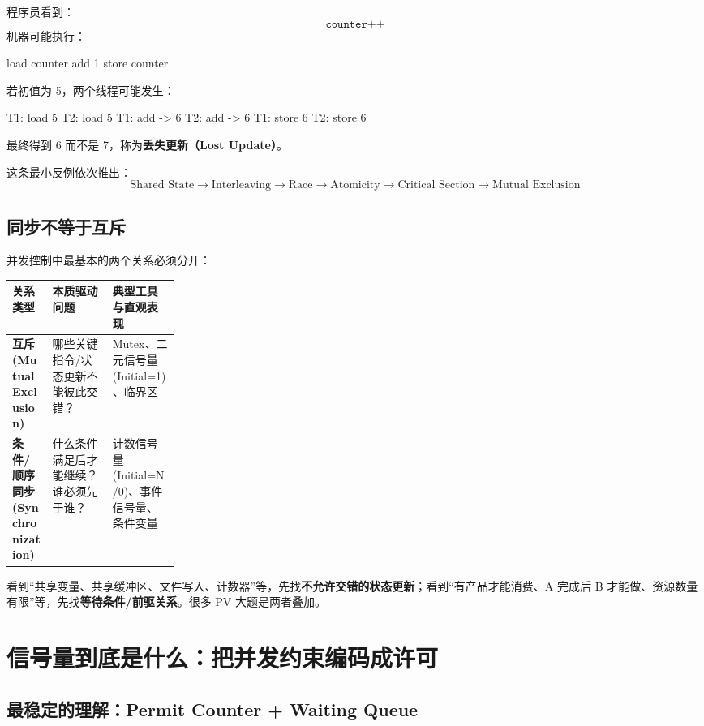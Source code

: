 \documentclass[11pt,a4paper]{ctexart}
\newcommand{\kw}[1]{\textbf{#1}}
\begin{document}
程序员看到：
\[
\texttt{counter++}
\]
机器可能执行：
\begin{codeblock}
load counter
add 1
store counter
\end{codeblock}
若初值为 5，两个线程可能发生：
\begin{codeblock}
T1: load 5
T2: load 5
T1: add  -> 6
T2: add  -> 6
T1: store 6
T2: store 6
\end{codeblock}
最终得到 6 而不是 7，称为\kw{丢失更新（Lost Update）}。

这条最小反例依次推出：
\[
\boxed{
\text{Shared State}
\to\text{Interleaving}
\to\text{Race}
\to\text{Atomicity}
\to\text{Critical Section}
\to\text{Mutual Exclusion}
}
\]

\subsection{同步不等于互斥}

并发控制中最基本的两个关系必须分开：

\begingroup
\small
\renewcommand{\arraystretch}{1.25}
\setlength{\tabcolsep}{6pt}
\begin{tabularx}{\linewidth}{>{\bfseries}p{0.24\linewidth} X X}
\toprule
关系类型 & 本质驱动问题 & 典型工具与直观表现\\
\midrule
互斥 (Mutual Exclusion) & 哪些关键指令/状态更新不能彼此交错？ & Mutex、二元信号量 (Initial=1)、临界区\\
条件/顺序同步 (Synchronization) & 什么条件满足后才能继续？谁必须先于谁？ & 计数信号量 (Initial=N/0)、事件信号量、条件变量\\
\bottomrule
\end{tabularx}
\endgroup

\begin{exam}[考试识别]
看到“共享变量、共享缓冲区、文件写入、计数器”等，先找\kw{不允许交错的状态更新}；看到“有产品才能消费、A 完成后 B 才能做、资源数量有限”等，先找\kw{等待条件/前驱关系}。很多 PV 大题是两者叠加。
\end{exam}

\section{信号量到底是什么：把并发约束编码成许可}

\subsection{最稳定的理解：Permit Counter + Waiting Queue}
\end{document}
